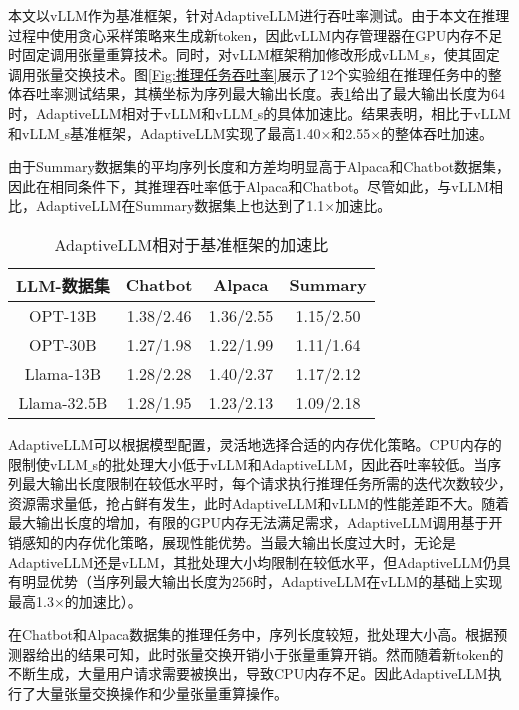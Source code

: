 本文以vLLM作为基准框架，针对AdaptiveLLM进行吞吐率测试。{\color{red}由于本文在推理过程中使用贪心采样策略来生成新token，因此vLLM内存管理器在GPU内存不足时固定调用张量重算技术。同时，对vLLM框架稍加修改形成vLLM$\_$s，使其固定调用张量交换技术。}图\ref{Fig:推理任务吞吐率}展示了12个实验组在推理任务中的整体吞吐率测试结果，其横坐标为序列最大输出长度。表\ref{Table:AdaptiveLLM相对于基准框架的加速比}给出了最大输出长度为64时，AdaptiveLLM相对于vLLM和vLLM$\_$s的具体加速比。结果表明，相比于vLLM和vLLM$\_$s基准框架，AdaptiveLLM实现了最高1.40$\times$和2.55$\times$的整体吞吐加速。

由于Summary数据集的平均序列长度和方差均明显高于Alpaca和Chatbot数据集，因此在相同条件下，其推理吞吐率低于Alpaca和Chatbot。尽管如此，与vLLM相比，AdaptiveLLM在Summary数据集上也达到了1.1$\times$加速比。

\begin{table}[H]
  \centering
  \caption{AdaptiveLLM相对于基准框架的加速比}
  \label{Table:AdaptiveLLM相对于基准框架的加速比}
  \renewcommand{\arraystretch}{1.15}
  \small
  \begin{tabular}{c c c c}
    \toprule
    \textbf{LLM-数据集} & \textbf{Chatbot} & \textbf{Alpaca} & \textbf{Summary} \\
    \midrule
    OPT-13B	& 1.38/2.46 & 1.36/2.55 & 1.15/2.50 \\
    OPT-30B	& 1.27/1.98 & 1.22/1.99 & 1.11/1.64 \\
    Llama-13B & 1.28/2.28 & 1.40/2.37 & 1.17/2.12 \\
    Llama-32.5B & 1.28/1.95 & 1.23/2.13 & 1.09/2.18 \\
    \bottomrule
  \end{tabular}
\end{table}

AdaptiveLLM可以根据模型配置，灵活地选择合适的内存优化策略。CPU内存的限制使vLLM$\_$s的批处理大小低于vLLM和AdaptiveLLM，因此吞吐率较低。当序列最大输出长度限制在较低水平时，每个请求执行推理任务所需的迭代次数较少，资源需求量低，抢占鲜有发生，此时AdaptiveLLM和vLLM的性能差距不大。随着最大输出长度的增加，有限的GPU内存无法满足需求，AdaptiveLLM调用基于开销感知的内存优化策略，展现性能优势。当最大输出长度过大时，无论是AdaptiveLLM还是vLLM，其批处理大小均限制在较低水平，但AdaptiveLLM仍具有明显优势（当序列最大输出长度为256时，AdaptiveLLM在vLLM的基础上实现最高1.3$\times$的加速比）。

在Chatbot和Alpaca数据集的推理任务中，序列长度较短，批处理大小高。根据预测器给出的结果可知，此时张量交换开销小于张量重算开销。然而随着新token的不断生成，大量用户请求需要被换出，导致CPU内存不足。因此AdaptiveLLM执行了大量张量交换操作和少量张量重算操作。

